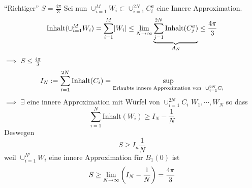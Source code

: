 \begin{Bew}
  ``Richtiger'' $S=\frac{4\pi}{3}$ Sei nun $\cup_{i=1}^MW_i\subset\cup_{i=1}^{2N}C_i^a$ eine Innere Approximation.
  \[\text{Inhalt}(\cup_{i=1}^MW_i)=\sum^M_{i=1}\mathopen| W_i \mathclose|\leq \displaystyle\lim_{N\rightarrow\infty}\underbrace{\sum_{j=1}^{2N}\text{Inhalt}(C_j^a)}_{A_N}\leq\frac{4\pi}{3}\]
  $\implies$ $S\leq \frac{4\pi}{3}$
  \[I_N:=\sum_{i=1}^{2N}\text{Inhalt}(C_i)=\sup_{\text{Erlaubte innere Approximation von}\hspace{2mm} \cup_{i=1}^{2N}C_i}\]
  $\implies$ $\exists$ eine innere Approximation mit Würfel von $\cup_{i=1}^{2N}C_i$ $W_1,\cdots,W_N$ so dass
  \[\sum_{i=1}^N\text{Inhalt}(W_i)\geq I_N-\frac{1}{N}\]
  Deswegen
  \[S\geq I_n\frac{1}{N}\]
  weil $\cup_{i=1}^{N'}W_i$ eine innere Approximation für $B_1(0)$ ist
  \[S\geq \displaystyle\lim_{N\rightarrow\infty}\left( I_N-\frac{1}{N} \right)=\frac{4\pi}{3}\]
\end{Bew}
